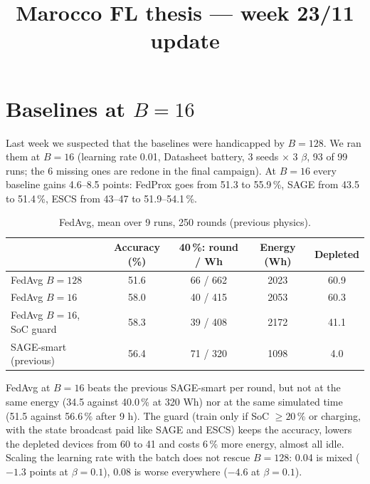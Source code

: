 \documentclass[10pt,a4paper]{article}
\title{\bfseries Marocco FL thesis --- week 23/11 update}
\author{}
\date{}
\begin{document}
\maketitle
\vspace{-3.6em}

\section{Baselines at $B = 16$}
\label{sec:val}

Last week we suspected that the baselines were handicapped by $B = 128$. We ran
them at $B = 16$ (learning rate 0.01, Datasheet battery, 3 seeds $\times$ 3
$\beta$, 93 of 99 runs; the 6 missing ones are redone in the final campaign).
At $B = 16$ every baseline gains 4.6--8.5 points: FedProx goes from 51.3 to
55.9\,\%, SAGE from 43.5 to 51.4\,\%, ESCS from 43--47 to 51.9--54.1\,\%.

\begin{table}[H]
  \centering\small
  \caption{FedAvg, mean over 9 runs, 250 rounds (previous physics).}
  \label{tab:val}
  \begin{tabular}{lcccc}
    \toprule
    & Accuracy (\%) & 40\,\%: round / Wh & Energy (Wh) & Depleted \\
    \midrule
    FedAvg $B = 128$              & 51.6 & 66 / 662 & 2023 & 60.9 \\
    FedAvg $B = 16$               & 58.0 & 40 / 415 & 2053 & 60.3 \\
    FedAvg $B = 16$, SoC guard    & 58.3 & 39 / 408 & 2172 & 41.1 \\
    SAGE-smart (previous)         & 56.4 & 71 / 320 & 1098 & 4.0 \\
    \bottomrule
  \end{tabular}
\end{table}

FedAvg at $B = 16$ beats the previous SAGE-smart per round, but not at the same
energy (34.5 against 40.0\,\% at 320 Wh) nor at the same simulated time (51.5
against 56.6\,\% after 9 h). The guard (train only if SoC $\geq 20\,\%$ or
charging, with the state broadcast paid like SAGE and ESCS) keeps the accuracy,
lowers the depleted devices from 60 to 41 and costs 6\,\% more energy, almost
all idle. Scaling the learning rate with the batch does not rescue $B = 128$:
0.04 is mixed ($-1.3$ points at $\beta = 0.1$), 0.08 is worse everywhere
($-4.6$ at $\beta = 0.1$).

\end{document}
